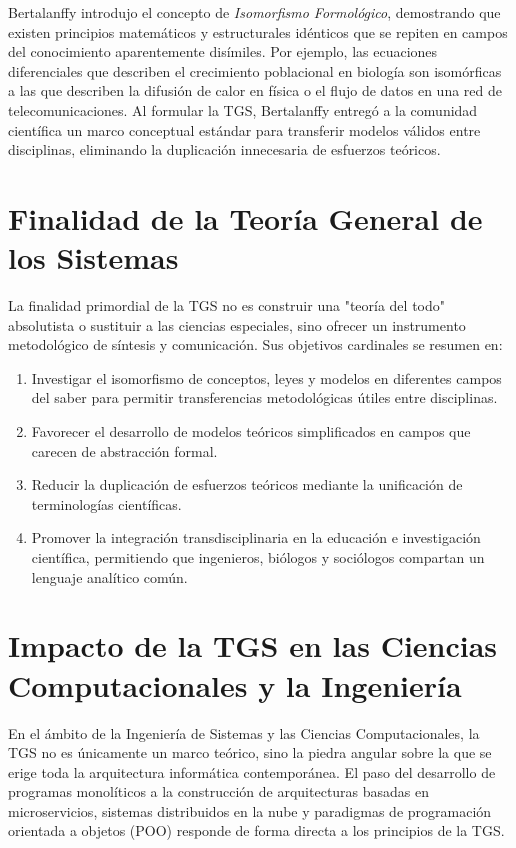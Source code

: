 \documentclass[12pt,letterpaper]{article}
\begin{document}
Bertalanffy introdujo el concepto de \textit{Isomorfismo Formológico}, demostrando que existen principios matemáticos y estructurales idénticos que se repiten en campos del conocimiento aparentemente disímiles. Por ejemplo, las ecuaciones diferenciales que describen el crecimiento poblacional en biología son isomórficas a las que describen la difusión de calor en física o el flujo de datos en una red de telecomunicaciones. Al formular la TGS, Bertalanffy entregó a la comunidad científica un marco conceptual estándar para transferir modelos válidos entre disciplinas, eliminando la duplicación innecesaria de esfuerzos teóricos.

\section*{Finalidad de la Teoría General de los Sistemas}

La finalidad primordial de la TGS no es construir una "teoría del todo" absolutista o sustituir a las ciencias especiales, sino ofrecer un instrumento metodológico de síntesis y comunicación. Sus objetivos cardinales se resumen en:

\begin{enumerate}[leftmargin=1.27cm, label=\alph*)]
    \item Investigar el isomorfismo de conceptos, leyes y modelos en diferentes campos del saber para permitir transferencias metodológicas útiles entre disciplinas.
    \item Favorecer el desarrollo de modelos teóricos simplificados en campos que carecen de abstracción formal.
    \item Reducir la duplicación de esfuerzos teóricos mediante la unificación de terminologías científicas.
    \item Promover la integración transdisciplinaria en la educación e investigación científica, permitiendo que ingenieros, biólogos y sociólogos compartan un lenguaje analítico común.
\end{enumerate}
\newpage
\section*{Impacto de la TGS en las Ciencias Computacionales y la Ingeniería}

En el ámbito de la Ingeniería de Sistemas y las Ciencias Computacionales, la TGS no es únicamente un marco teórico, sino la piedra angular sobre la que se erige toda la arquitectura informática contemporánea. El paso del desarrollo de programas monolíticos a la construcción de arquitecturas basadas en microservicios, sistemas distribuidos en la nube y paradigmas de programación orientada a objetos (POO) responde de forma directa a los principios de la TGS.
\end{document}
